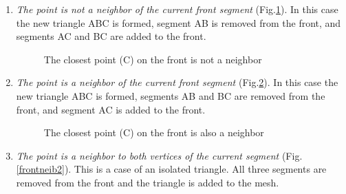 \documentclass[12pt]{article}
\begin{document}
\begin{enumerate}

\item {\em The point is not a neighbor of the current front segment} (Fig.\ref{frontfar}).
In this case the new triangle ABC is formed, segment AB is removed from the front, and segments AC and BC are added to the front.

\begin{figure}
\center
{}
\caption{\label{frontfar}The closest point (C) on the front is not a neighbor}
\end{figure}

\item {\em The point is a neighbor of the current front segment}
(Fig.\ref{frontneib1}). 
In this case the new triangle ABC is formed, segments AB and BC are removed from the front, and segment AC is added to the front.

\begin{figure}
\center
{}
\caption{\label{frontneib1}The closest point (C) on the front is also a neighbor}
\end{figure}

\item {\em The point is a neighbor to both vertices of the current segment}
(Fig.\ref{frontneib2}).
This is a case of an isolated triangle. All three segments are removed from the front and the triangle is added to the mesh.



\end{enumerate}
\end{document}

